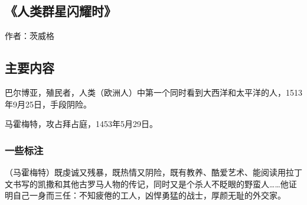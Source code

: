 \subsection{《人类群星闪耀时》}
作者：茨威格

\subsection{主要内容}
\begin{itemize*}
	\item 巴尔博亚，殖民者，人类（欧洲人）中第一个同时看到大西洋和太平洋的人，1513年9月25日，手段阴险。
	\item 马霍梅特，攻占拜占庭，1453年5月29日。
	
\end{itemize*}

\subsubsection{一些标注}

（马霍梅特）既虔诚又残暴，既热情又阴险，既有教养、酷爱艺术、能阅读用拉丁文书写的凯撒和其他古罗马人物的传记，同时又是个杀人不眨眼的野蛮人……他证明自己一身而三任：不知疲倦的工人，凶悍勇猛的战士，厚颜无耻的外交家。
